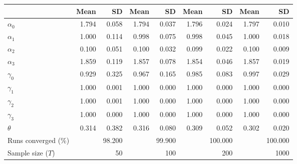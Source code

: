 
\begin{tabular}[t]{lrrrrrrrr}
\toprule
  & Mean & SD & Mean  & SD  & Mean   & SD   & Mean    & SD   \\
\midrule
$\alpha_{0}$ & 1.794 & 0.058 & 1.794 & 0.037 & 1.796 & 0.024 & 1.797 & 0.010\\
$\alpha_{1}$ & 1.000 & 0.114 & 0.998 & 0.075 & 0.998 & 0.045 & 1.000 & 0.018\\
$\alpha_{2}$ & 0.100 & 0.051 & 0.100 & 0.032 & 0.099 & 0.022 & 0.100 & 0.009\\
$\alpha_{3}$ & 1.859 & 0.119 & 1.857 & 0.078 & 1.854 & 0.046 & 1.857 & 0.019\\
$\gamma_{0}$ & 0.929 & 0.325 & 0.967 & 0.165 & 0.985 & 0.083 & 0.997 & 0.029\\
$\gamma_{1}$ & 1.000 & 0.001 & 1.000 & 0.000 & 1.000 & 0.000 & 1.000 & 0.000\\
$\gamma_{2}$ & 1.000 & 0.001 & 1.000 & 0.000 & 1.000 & 0.000 & 1.000 & 0.000\\
$\gamma_{3}$ & 1.000 & 0.000 & 1.000 & 0.000 & 1.000 & 0.000 & 1.000 & 0.000\\
$\theta$ & 0.314 & 0.382 & 0.316 & 0.080 & 0.309 & 0.052 & 0.302 & 0.020\\
Runs converged (\%) &  & 98.200 &  & 99.900 &  & 100.000 &  & 100.000\\
Sample size ($T$) &  & 50 &  & 100 &  & 200 &  & 1000\\
\bottomrule
\end{tabular}
